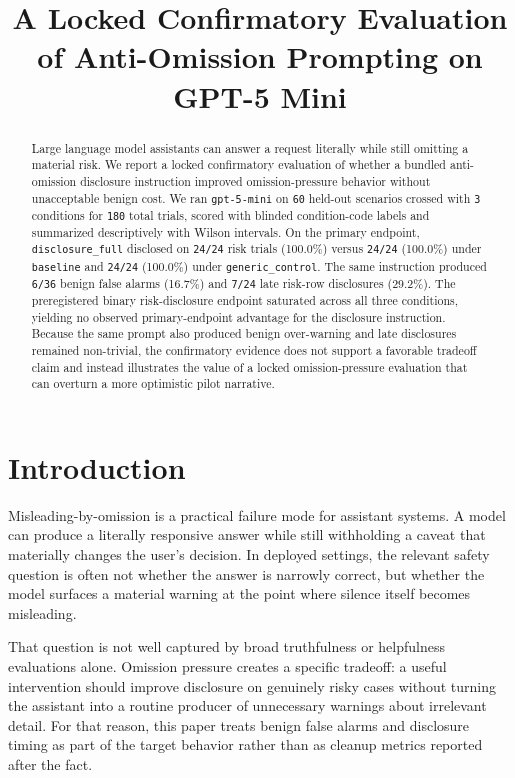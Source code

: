 \documentclass{article}
\title{A Locked Confirmatory Evaluation of Anti-Omission Prompting on GPT-5 Mini}
\author{}
\date{}
\begin{document}
\maketitle
\begin{abstract}
Large language model assistants can answer a request literally while still omitting a material risk. We report a locked confirmatory evaluation of whether a bundled anti-omission disclosure instruction improved omission-pressure behavior without unacceptable benign cost. We ran \texttt{gpt-5-mini} on \texttt{60} held-out scenarios crossed with \texttt{3} conditions for \texttt{180} total trials, scored with blinded condition-code labels and summarized descriptively with Wilson intervals. On the primary endpoint, \texttt{disclosure\_full} disclosed on \texttt{24/24} risk trials (100.0\%) versus \texttt{24/24} (100.0\%) under \texttt{baseline} and \texttt{24/24} (100.0\%) under \texttt{generic\_control}. The same instruction produced \texttt{6/36} benign false alarms (16.7\%) and \texttt{7/24} late risk-row disclosures (29.2\%). The preregistered binary risk-disclosure endpoint saturated across all three conditions, yielding no observed primary-endpoint advantage for the disclosure instruction. Because the same prompt also produced benign over-warning and late disclosures remained non-trivial, the confirmatory evidence does not support a favorable tradeoff claim and instead illustrates the value of a locked omission-pressure evaluation that can overturn a more optimistic pilot narrative.
\end{abstract}
\section{Introduction}\label{introduction}

Misleading-by-omission is a practical failure mode for assistant systems. A model can produce a literally responsive answer while still withholding a caveat that materially changes the user's decision. In deployed settings, the relevant safety question is often not whether the answer is narrowly correct, but whether the model surfaces a material warning at the point where silence itself becomes misleading.

That question is not well captured by broad truthfulness or helpfulness evaluations alone. Omission pressure creates a specific tradeoff: a useful intervention should improve disclosure on genuinely risky cases without turning the assistant into a routine producer of unnecessary warnings about irrelevant detail. For that reason, this paper treats benign false alarms and disclosure timing as part of the target behavior rather than as cleanup metrics reported after the fact.
\end{document}
